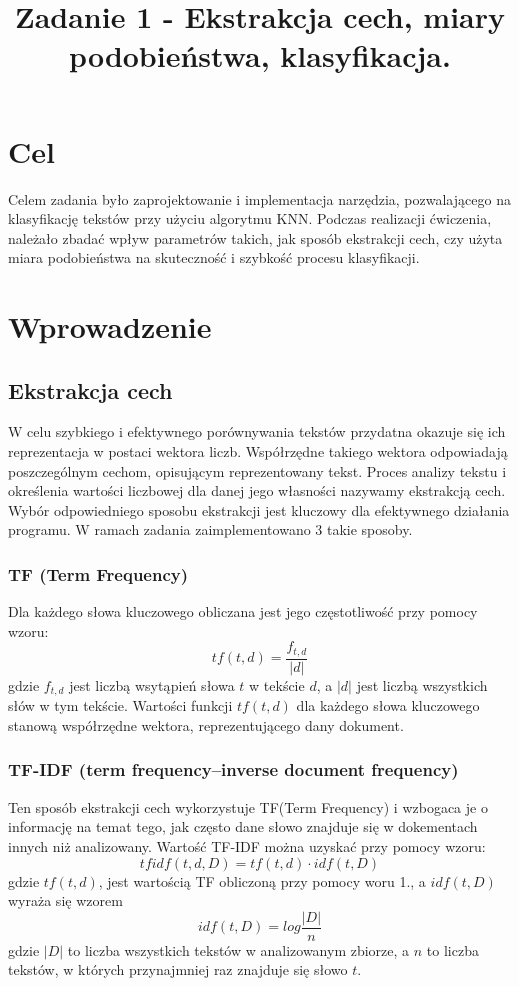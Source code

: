 \documentclass{classrep}
\author{
  \studentinfo{Paweł Młynarczyk}{210278} \and
  \studentinfo{Mateusz Kuźniarek}{210245}
}
\title{Zadanie 1 - Ekstrakcja cech, miary podobieństwa, klasyfikacja.}
\begin{document}
\maketitle

\section{Cel}
Celem zadania było zaprojektowanie i implementacja narzędzia, pozwalającego na klasyfikację tekstów przy użyciu algorytmu KNN. Podczas realizacji ćwiczenia, należało zbadać wpływ parametrów takich, jak sposób ekstrakcji cech, czy użyta miara podobieństwa na skuteczność i szybkość procesu klasyfikacji.

\section{Wprowadzenie}
\subsection{Ekstrakcja cech}
W celu szybkiego i efektywnego porównywania tekstów przydatna okazuje się ich reprezentacja w postaci wektora liczb. Współrzędne takiego wektora odpowiadają poszczególnym cechom, opisującym reprezentowany tekst. Proces analizy tekstu i określenia wartości liczbowej dla danej jego własności nazywamy ekstrakcją cech. Wybór odpowiedniego sposobu ekstrakcji jest kluczowy dla efektywnego działania programu. W ramach zadania zaimplementowano 3 takie sposoby.


\subsubsection{TF (Term Frequency)}
Dla każdego słowa kluczowego obliczana jest jego częstotliwość przy pomocy wzoru: 
\begin{equation}
tf(t,d) =  \frac{f_{t,d}}{|d|}
\end{equation}
gdzie \(f_{t,d}\) jest liczbą wsytąpień słowa \(t\) w tekście \(d\), a \(|d|\) jest liczbą wszystkich słów w tym tekście. Wartości funkcji \(tf(t,d)\) dla każdego słowa kluczowego stanową współrzędne wektora, reprezentującego dany dokument.

\subsubsection{TF-IDF (term frequency–inverse document frequency)}
Ten sposób ekstrakcji cech wykorzystuje TF(Term Frequency) i wzbogaca je o informację na temat tego, jak często dane słowo znajduje się w dokementach innych niż analizowany. Wartość TF-IDF można uzyskać przy pomocy wzoru: 
\begin{equation}
tfidf(t,d,D) = tf(t,d) \cdot idf(t,D)
\end{equation}
gdzie \(tf(t,d)\), jest wartością TF obliczoną przy pomocy woru 1., a \(idf(t,D)\) wyraża się wzorem
\begin{equation}
idf(t,D) = log\frac{|D|}{n}
\end{equation}
gdzie \(|D|\) to liczba wszystkich tekstów w analizowanym zbiorze, a \(n\) to liczba tekstów, w których przynajmniej raz znajduje się słowo \(t\).
\end{document}
